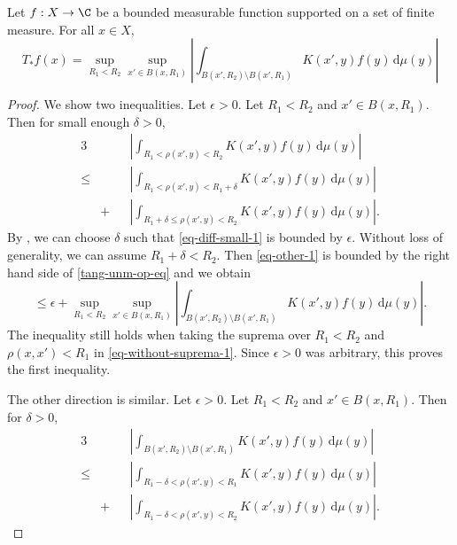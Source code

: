 \begin{lemma}
    \label{nontangential-operator-boundary}
    \leanok
    Let $f:X\to\C$ be a bounded measurable function supported on a set of finite measure.
    For all $x\in X$,
    \begin{equation}
    \label{tang-unm-op-eq}
        T_*f(x) = \sup_{R_1 < R_2} \sup_{x'\in B(x,R_1)} \left|\int_{B(x',R_2)\setminus B(x',R_1)} K(x',y) f(y) \, \mathrm{d}\mu(y) \right|
    \end{equation}
\end{lemma}
\begin{proof}
\leanok
We show two inequalities. Let $\epsilon>0$.
Let $R_1<R_2$ and $x'\in B(x,R_1)$. Then for small enough $\delta>0$,
\begin{alignat}{3}
    \label{eq-without-suprema-1}
    &&&\left|\int_{R_1<\rho(x',y)<R_2} K(x',y) f(y) \, \mathrm{d}\mu(y) \right| \\
    \label{eq-diff-small-1}
    \le &&&\left|\int_{R_1<\rho(x',y)<R_1+\delta} K(x',y) f(y) \, \mathrm{d}\mu(y) \right| \\
    \label{eq-other-1}
    &+&&\left|\int_{R_1+\delta\le\rho(x',y)<R_2} K(x',y) f(y) \, \mathrm{d}\mu(y) \right| .
\end{alignat}
By , we can choose $\delta$ such that \eqref{eq-diff-small-1} is bounded by $\epsilon$. Without loss of generality, we can assume $R_1+\delta<R_2$. Then \eqref{eq-other-1} is bounded by the right hand side of \eqref{tang-unm-op-eq} and we obtain
\begin{equation*}
    \le \epsilon + \sup_{R_1 < R_2} \sup_{x'\in B(x,R_1)} \left|\int_{B(x',R_2)\setminus B(x',R_1)} K(x',y) f(y) \, \mathrm{d}\mu(y) \right| .
\end{equation*}
The inequality still holds when taking the suprema over $R_1<R_2$ and $\rho(x,x')<R_1$ in \eqref{eq-without-suprema-1}. Since $\epsilon>0$ was arbitrary, this proves the first inequality.

The other direction is similar. Let $\epsilon>0$.
Let $R_1<R_2$ and $x'\in B(x,R_1)$. Then for $\delta>0$,
\begin{alignat}{3}
    \label{eq-without-suprema-2}
    &&&\left|\int_{B(x',R_2)\setminus B(x',R_1)} K(x',y) f(y) \, \mathrm{d}\mu(y) \right| \\
    \label{eq-diff-small-2}
    \le &&&\left|\int_{R_1-\delta<\rho(x',y)< R_1} K(x',y) f(y) \, \mathrm{d}\mu(y) \right| \\
    \label{eq-other-2}
    &+&&\left|\int_{R_1-\delta<\rho(x',y)<R_2} K(x',y) f(y) \, \mathrm{d}\mu(y) \right| .
\end{alignat}


\end{proof}
